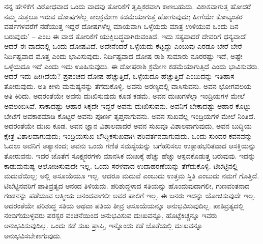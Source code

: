 ನನ್ನ ಹೇಳಿಕೆಗೆ ವಿರೋಧವಾದ ಒಂದು ವಾದವು ತೋರಿಕೆಗೆ ತೃಪ್ತಿಕರವಾಗಿ ಕಾಣಬಹುದು. ವಿಕಾಸವಾಗುತ್ತ ಹೋದರೆ ನಮ್ಮ ಸುತ್ತಲೂ ಇರುವ ದೋಷಗಳೆಲ್ಲ ಕಾಲಕ್ರಮೇಣ ಕಡಮೆಯಾಗುತ್ತ ಹೋಗುವುದು; ಹೀಗೆಯೇ ಕೋಟ್ಯಂತರ ವರ್ಷಗಳವರೆಗೆ ನಡೆಯುತ್ತ ಇದ್ದರೆ ದೋಷಗಳೆಲ್ಲ ಮಾಯವಾಗಿ ಒಳ್ಳೆಯದು ಮಾತ್ರ ಉಳಿಯುವ ಒಂದು ದಿನ ಬರುವುದು’ – ಎಂಬ ಈ ವಾದ ತೋರಿಕೆಗೆ ಯುಕ್ತಿಬದ್ಧವಾಗಿರುವಂತಿದೆ. ಇದು ಸತ್ಯವಾದರೆ ದೇವರಿಗೆ ಧನ್ಯವಾದ! ಆದರೆ ಈ ವಾದದಲ್ಲಿ ಒಂದು ದೋಷವಿದೆ. ಅದೇನೆಂದರೆ ಒಳ್ಳೆಯದು ಕೆಟ್ಟದ್ದು ಎಂಬುವು ಎರಡೂ ಬೇರೆ ಬೇರೆ ನಿರ್ದಿಷ್ಟವಾದ ಮೊತ್ತ ಎಂದು ಭಾವಿಸುವುದು. ನಿರ್ದಿಷ್ಟವಾದ ದೋಷ ರಾಶಿ ಸುಮಾರು ನೂರರಷ್ಟು ಇದೆ, ಅಷ್ಟೇ ಒಳ್ಳೆಯದೂ ಇದೆ ಎಂದು ಇದು ಊಹಿಸುವುದು. ಈ ದೋಷರಾಶಿ ಕ್ರಮೇಣ ಕಡಮೆಯಾಗುತ್ತಿದೆ ಎಂದು ಭಾವಿಸುವರು. ಆದರೆ ಇದು ಹೀಗಿದೆಯೆ? ಪ್ರಪಂಚದ ದೋಷ ಹೆಚ್ಚುತ್ತಿದೆ, ಒಳ್ಳೆಯದೂ ಹೆಚ್ಚುತ್ತಿದೆ ಎಂಬುದನ್ನು ಇತಿಹಾಸ ತೋರುವುದು. ಅತಿ ಕೀಳು ಮನುಷ್ಯನನ್ನು ತೆಗೆದುಕೊಳ್ಳಿ. ಅವನು ಅರಣ್ಯದಲ್ಲಿ ವಾಸಿಸುವನು. ಅವನ ಭೋಗವಲಯ ಅತಿ ಕಿರಿದು. ಅದರಂತೆಯೇ ಅವನು ದುಃಖಿಸುವುದು ಕೂಡ ಕಡಮೆ. ಅವನ ದುಃಖಗಳೆಲ್ಲಾ ಇಂದ್ರಿಯಗಳ ಮೇಲೆ ಅವಲಂಬಿಸಿವೆ. ಸಾಕಾದಷ್ಟು ಆಹಾರ ಸಿಕ್ಕದೇ ಇದ್ದರೆ ಅವನು ದುಃಖಿಸುವನು. ಅವನಿಗೆ ಬೇಕಾದಷ್ಟು ಆಹಾರ ಕೊಟ್ಟು ಬೇಟೆಗೆ ಅವಕಾಶಮಾಡಿ ಕೊಟ್ಟರೆ ಅವನು ಪೂರ್ಣ ತೃಪ್ತನಾಗುವನು. ಅವನ ಸುಖವೆಲ್ಲ ಇಂದ್ರಿಯಗಳ ಮೇಲೆ ನಿಂತಿದೆ. ಅದರಂತೆಯೇ ದುಃಖ ಕೂಡ. ಅವನ ಜ್ಞಾನ ವಿಶಾಲವಾದರೆ ಅವನ ಸುಖವೂ ವಿಶಾಲವಾಗುವುದು, ಅವನ ಬುದ್ಧಿಯ ಕ್ಷೇತ್ರ ವಿಶಾಲವಾಗುವುದು; ಇಂದ್ರಿಯಸುಖ ಬೌದ್ಧಿಕಸುಖವಾಗಿ ಪರಿವರ್ತನವಾಗುವುದು. ಒಂದು ಸುಂದರ ಕವನವನ್ನು ಓದಲು ಅವನಿಗೆ ಅತ್ಯಾನಂದ; ಅವನು ಒಂದು ಗಣಿತ ಸಮಸ್ಯೆಯನ್ನು ಬಗೆಹರಿಸಲು ಉತ್ಸಾಹಭರಿತವಾದ ಆಸಕ್ತಿಯನ್ನು ತೋರುವನು. ಇದರ ಜೊತೆಗೆ ಸೂಕ್ಷ್ಮನರಗಳು ಮಾನಸಿಕ ದುಃಖಕ್ಕೆ ಹೆಚ್ಚು ಹೆಚ್ಚು ಆಸ್ಪದಕೊಡುತ್ತ ಬರುವುವು. ಇದನ್ನು ಕಾಡುಮನುಷ್ಯ ಆಲೋಚಿಸುವುದೇ ಇಲ್ಲ. ಒಂದು ಸರಳವಾದ ಉದಾಹರಣೆಯನ್ನು ತೆಗೆದುಕೊಳ್ಳಿ. ಟಿಬೆಟ್ಟಿನಲ್ಲಿ ಮದುವೆಯಿಲ್ಲ; ಅಲ್ಲಿ ಅಸೂಯೆಯೂ ಇಲ್ಲ. ಆದರೂ ಮದುವೆ ಎಂಬುದು ಉತ್ತಮ ಸ್ಥಿತಿ ಎಂಬುದು ನಮಗೆ ಗೊತ್ತಿದೆ. ಟಿಬೆಟ್ಟಿನವರಿಗೆ ಪಾತಿವ್ರತ್ಯದ ಆನಂದ ತಿಳಿಯದು. ಪರಿಶುದ್ಧಳಾದ ಸತಿಯನ್ನು ಹೊಂದುವುದಾಗಲೀ, ಗುಣವಂತನಾದ ಗಂಡನನ್ನು ಪಡೆಯುವ ಆತ್ಮೀಯ ಆನಂದವಾಗಲೀ ಅವರ ಪಾಲಿಗೆ ಇಲ್ಲ. ಈ ಜನರು ಇದನ್ನು ಯೋಚಿಸುವುದೇ ಇಲ್ಲ. ಅದರಂತೆಯೇ ಪರಿಶುದ್ಧ ಸತಿಯ ಅಥವಾ ಪತಿಯ ತೀವ್ರ ಅಸೂಯೆಯನ್ನೂ ಅನುಭವಿಸುವುದಿಲ್ಲ. ಪಾತಿವ್ರತ್ಯದಲ್ಲಿ ನಂಬಿಗೆಯುಳ್ಳವರು ಪರಸ್ಪರ ವಂಚನೆಯಿಂದ ಅನುಭವಿಸುವ ದುಃಖವನ್ನೂ, ಹೊಟ್ಟೆಕಿಚ್ಚನ್ನೂ ಇವರು ಅನುಭವಿಸುವುದಿಲ್ಲ. ಒಂದು ಕಡೆ ಸುಖ ಪ್ರಾಪ್ತಿ, ಇನ್ನೊಂದು ಕಡೆ ಜೊತೆಯಲ್ಲಿ ದುಃಖವನ್ನೂ ಅನುಭವಿಸಬೇಕಾಗುವುದು.

